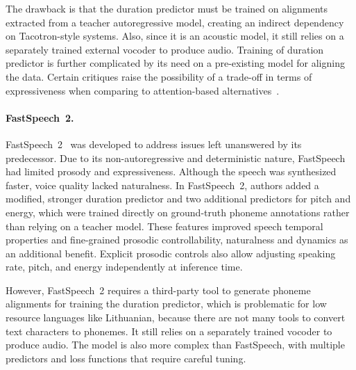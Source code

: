 \documentclass[
         english, %
    monochrome, %
]{VUMIFSEMasterThesis}
\begin{document}
The drawback is that the duration predictor must be trained on alignments extracted from a teacher autoregressive model, creating an indirect dependency on Tacotron-style systems.
Also, since it is an acoustic model, it still relies on a separately trained external vocoder to produce audio.
Training of duration predictor is further complicated by its need on a pre-existing model for aligning the data.
Certain critiques raise the possibility of a trade-off in terms of expressiveness when comparing to attention-based alternatives~\cite{ren2020fastspeech}.

\paragraph{FastSpeech~2.}
FastSpeech~2~\cite{ren2020fastspeech} was developed to address issues left unanswered by its predecessor.
Due to its non-autoregressive and deterministic nature, FastSpeech had limited prosody and expressiveness.
Although the speech was synthesized faster, voice quality lacked naturalness.
In FastSpeech~2, authors added a modified, stronger duration predictor and two additional predictors for pitch and energy, which were trained directly on ground-truth phoneme annotations rather than relying on a teacher model.
These features improved speech temporal properties and fine-grained prosodic controllability, naturalness and dynamics as an additional benefit.
Explicit prosodic controls also allow adjusting speaking rate, pitch, and energy independently at inference time.

However, FastSpeech~2 requires a third-party tool to generate phoneme alignments for training the duration predictor, which is problematic for low resource languages like Lithuanian, because there are not many tools to convert text characters to phonemes.
It still relies on a separately trained vocoder to produce audio.
The model is also more complex than FastSpeech, with multiple predictors and loss functions that require careful tuning.
\end{document}
